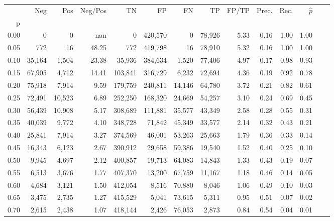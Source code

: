 \begin{tabular}{rrrrrrrrrrrrrr}
\toprule
{} &     Neg &     Pos & Neg/Pos &       TN &       FP &      FN &      TP & FP/TP & Prec. &  Rec. & $\hat{p}$ \\
p    &         &         &         &          &          &         &         &       &       &       &           \\
\midrule
0.00 &       0 &       0 &     nan &        0 &  420,570 &       0 &  78,926 &  5.33 &  0.16 &  1.00 &      1.00 \\
0.05 &     772 &      16 &   48.25 &      772 &  419,798 &      16 &  78,910 &  5.32 &  0.16 &  1.00 &      1.00 \\
0.10 &  35,164 &   1,504 &   23.38 &   35,936 &  384,634 &   1,520 &  77,406 &  4.97 &  0.17 &  0.98 &      0.93 \\
0.15 &  67,905 &   4,712 &   14.41 &  103,841 &  316,729 &   6,232 &  72,694 &  4.36 &  0.19 &  0.92 &      0.78 \\
0.20 &  75,918 &   7,914 &    9.59 &  179,759 &  240,811 &  14,146 &  64,780 &  3.72 &  0.21 &  0.82 &      0.61 \\
0.25 &  72,491 &  10,523 &    6.89 &  252,250 &  168,320 &  24,669 &  54,257 &  3.10 &  0.24 &  0.69 &      0.45 \\
0.30 &  56,439 &  10,908 &    5.17 &  308,689 &  111,881 &  35,577 &  43,349 &  2.58 &  0.28 &  0.55 &      0.31 \\
0.35 &  40,039 &   9,772 &    4.10 &  348,728 &   71,842 &  45,349 &  33,577 &  2.14 &  0.32 &  0.43 &      0.21 \\
0.40 &  25,841 &   7,914 &    3.27 &  374,569 &   46,001 &  53,263 &  25,663 &  1.79 &  0.36 &  0.33 &      0.14 \\
0.45 &  16,343 &   6,123 &    2.67 &  390,912 &   29,658 &  59,386 &  19,540 &  1.52 &  0.40 &  0.25 &      0.10 \\
0.50 &   9,945 &   4,697 &    2.12 &  400,857 &   19,713 &  64,083 &  14,843 &  1.33 &  0.43 &  0.19 &      0.07 \\
0.55 &   6,513 &   3,676 &    1.77 &  407,370 &   13,200 &  67,759 &  11,167 &  1.18 &  0.46 &  0.14 &      0.05 \\
0.60 &   4,684 &   3,121 &    1.50 &  412,054 &    8,516 &  70,880 &   8,046 &  1.06 &  0.49 &  0.10 &      0.03 \\
0.65 &   3,475 &   2,735 &    1.27 &  415,529 &    5,041 &  73,615 &   5,311 &  0.95 &  0.51 &  0.07 &      0.02 \\
0.70 &   2,615 &   2,438 &    1.07 &  418,144 &    2,426 &  76,053 &   2,873 &  0.84 &  0.54 &  0.04 &      0.01 \\

\end{tabular}
